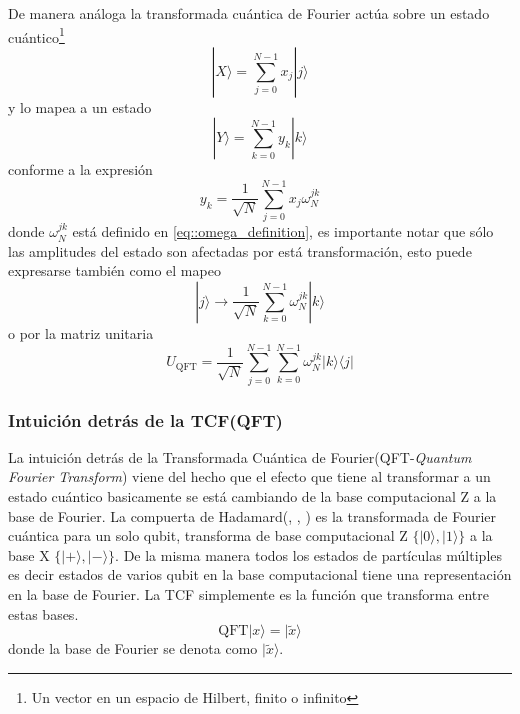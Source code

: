 \documentclass[a4paper]{article}
\begin{document}
De manera análoga la transformada cuántica de Fourier actúa sobre un estado cuántico\footnote{Un vector en un espacio de Hilbert, finito o infinito} 
\begin{equation}
|X\rangle=\sum_{j=0}^{N-1} x_{j}|j\rangle
\end{equation}
y lo mapea a un estado 
\begin{equation}\label{eq::QFT_general}
|Y\rangle=\sum_{k=0}^{N-1} y_{k}|k\rangle
\end{equation}
conforme a la expresión
\begin{equation}
y_k=\frac{1}{\sqrt{N}}\sum_{j=0}^{N-1}x_j\omega_{N}^{jk}
\end{equation}
donde $\omega_{N}^{jk}$ está definido en \ref{eq::omega_definition}, es importante notar que sólo las amplitudes del estado son afectadas por está transformación, esto puede expresarse también como el mapeo
\begin{equation}
|j\rangle \rightarrow \frac{1}{\sqrt{N}}\sum^{N-1}_{k=0}\omega_N^{jk}|k\rangle
\end{equation}
o por la matriz unitaria
\begin{equation}
U_{\text{QFT}}=\frac{1}{\sqrt{N}}\sum_{j=0}^{N-1}\sum_{k=0}^{N-1}\omega_{N}^{jk}|k\rangle\langle j|
\end{equation}
\subsubsection{Intuición detrás de la TCF(QFT)}
La intuición detrás de la Transformada Cuántica de Fourier(QFT-\textit{Quantum Fourier Transform}) viene del hecho que el efecto que tiene al transformar a un estado cuántico basicamente se está cambiando de la base computacional Z  a la base de Fourier. La compuerta de Hadamard(\cite{Medina}, \cite{Qiskit}, \cite{Nielsen}) es la transformada de Fourier cuántica para un solo qubit, transforma de base computacional Z $\{|0\rangle, |1\rangle\}$ a la base X $\{|+\rangle, |-\rangle \}$. De la misma manera todos los estados de partículas múltiples es decir estados de varios qubit en la base computacional tiene una representación en la base de Fourier. La TCF simplemente es la función que transforma entre estas bases.
\begin{equation}
\text{QFT}|x\rangle = |\tilde{x}\rangle
\end{equation}
donde la base de Fourier se denota como $|\tilde{x}\rangle$.
\end{document}
